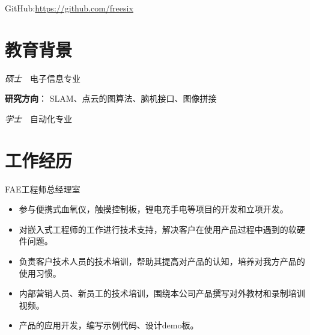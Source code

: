 \documentclass{resume}
\begin{document}


{\centerline{}}
{\centerline{GitHub:\hyperlink{https://github.com/freesix}{https://github.com/freesix}}}




\section{\textcolor[RGB]{50,50,190}{\faGraduationCap 教育背景}}

\textit{硕士}\ \ 电子信息专业

\textcolor[RGB]{80,100,190}{\textbf{研究方向}}：
SLAM、点云的图算法、脑机接口、图像拼接


\textit{学士}\ \ 自动化专业

\section{\textcolor[RGB]{50,50,190}{\faBriefcase 工作经历}}

FAE工程师\qquad 总经理室
\begin{itemize}
  \item 参与便携式血氧仪，触摸控制板，锂电充手电等项目的开发和立项开发。
  \item 对嵌入式工程师的工作进行技术支持，解决客户在使用产品过程中遇到的软硬件问题。
  \item 负责客户技术人员的技术培训，帮助其提高对产品的认知，培养对我方产品的使用习惯。
  \item 内部营销人员、新员工的技术培训，围绕本公司产品撰写对外教材和录制培训视频。
  \item 产品的应用开发，编写示例代码、设计demo板。
\end{itemize}
\end{document}

